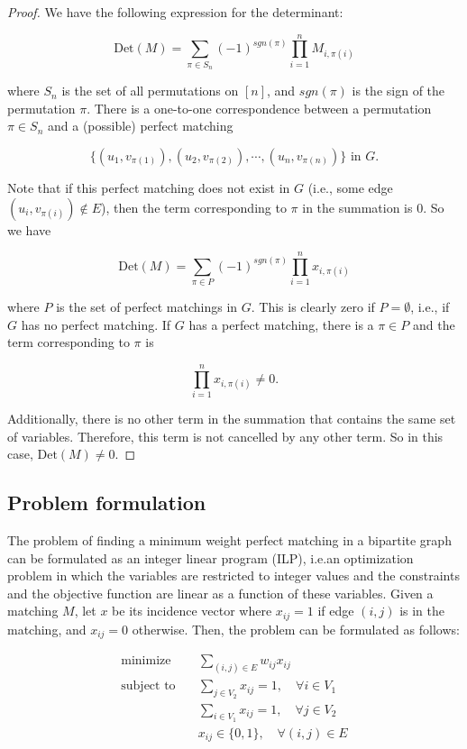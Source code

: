 \begin{proof}
    We have the following expression for the determinant:

    $$
    \text{Det}(M) = \sum_{\pi \in S_n} (-1)^{sgn(\pi)} \prod_{i=1}^{n} M_{i,\pi(i)}
    $$

    where $S_n$ is the set of all permutations on $[n]$, and $sgn(\pi)$ is the sign of the permutation $\pi$. There is a one-to-one correspondence between a permutation $\pi \in S_n$ and a (possible) perfect matching 

    $$
    \{(u_1, v_{\pi(1)}), (u_2, v_{\pi(2)}), \cdots , (u_n, v_{\pi(n)})\} \text{ in } G.
    $$

    Note that if this perfect matching does not exist in $G$ (i.e., some edge $(u_i, v_{\pi(i)}) \notin E$), then the term corresponding to $\pi$ in the summation is $0$. So we have

    $$
    \text{Det}(M) = \sum_{\pi \in P} (-1)^{sgn(\pi)} \prod_{i=1}^{n} x_{i,\pi(i)}
    $$

    where $P$ is the set of perfect matchings in $G$. This is clearly zero if $P = \emptyset$, i.e., if $G$ has no perfect matching. If $G$ has a perfect matching, there is a $\pi \in P$ and the term corresponding to $\pi$ is

    $$
    \prod_{i=1}^{n} x_{i,\pi(i)} \neq 0.
    $$

    Additionally, there is no other term in the summation that contains the same set of variables. Therefore, this term is not cancelled by any other term. So in this case, $\text{Det}(M) \neq 0$.
\end{proof}

\subsection{Problem formulation}
The problem of finding a minimum weight perfect matching in a bipartite graph can be formulated as an integer linear program (ILP), i.e.an optimization problem in which the variables are restricted to integer values and the constraints and the objective function are linear as a function of these variables. Given a matching $M$, let $x$ be its incidence vector where $x_{ij} = 1$ if edge $(i, j)$ is in the matching, and $x_{ij} = 0$ otherwise. Then, the problem can be formulated as follows:

\begin{equation}
    \begin{aligned}
        \text{minimize} \quad & \sum_{(i, j) \in E} w_{ij} x_{ij} \\
        \text{subject to} \quad & \sum_{j \in V_2} x_{ij} = 1, \quad \forall i \in V_1 \\
        & \sum_{i \in V_1} x_{ij} = 1, \quad \forall j \in V_2 \\
        & x_{ij} \in \{0, 1\}, \quad \forall (i, j) \in E
    \end{aligned}
\end{equation}

